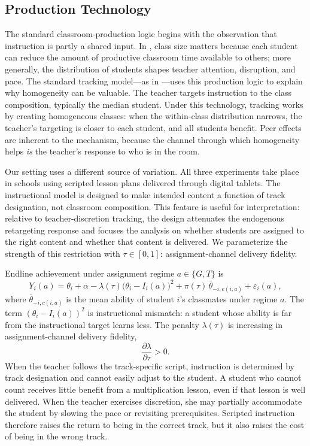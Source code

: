 \documentclass[11pt]{article}
\begin{document}
\subsection{Production Technology}

The standard classroom-production logic begins with the observation that instruction is partly a shared input. In \citet{Lazear2001}, class size matters because each student can reduce the amount of productive classroom time available to others; more generally, the distribution of students shapes teacher attention, disruption, and pace. The standard tracking model---as in \citet{duflo2011peer}---uses this production logic to explain why homogeneity can be valuable. The teacher targets instruction to the class composition, typically the median student. Under this technology, tracking works by creating homogeneous classes: when the within-class distribution narrows, the teacher's targeting is closer to each student, and all students benefit. Peer effects are inherent to the mechanism, because the channel through which homogeneity helps \emph{is} the teacher's response to who is in the room.

Our setting uses a different source of variation. All three experiments take place in schools using scripted lesson plans delivered through digital tablets. The instructional model is designed to make intended content a function of track designation, not classroom composition. This feature is useful for interpretation: relative to teacher-discretion tracking, the design attenuates the endogenous retargeting response and focuses the analysis on whether students are assigned to the right content and whether that content is delivered. We parameterize the strength of this restriction with $\tau \in [0,1]$: assignment-channel delivery fidelity.

Endline achievement under assignment regime $a \in \{G, T\}$ is
\begin{equation}
\label{eq:learning}
Y_i(a) = \theta_i + \alpha - \lambda(\tau)\big(\theta_i - I_i(a)\big)^2 + \pi(\tau)\,\bar{\theta}_{-i,c(i,a)} + \varepsilon_i(a),
\end{equation}
where $\bar{\theta}_{-i,c(i,a)}$ is the mean ability of student $i$'s classmates under regime $a$. The term $(\theta_i - I_i(a))^2$ is instructional mismatch: a student whose ability is far from the instructional target learns less. The penalty $\lambda(\tau)$ is increasing in assignment-channel delivery fidelity,
\begin{equation}
\label{eq:lambda_tau}
\frac{\partial \lambda}{\partial \tau} > 0.
\end{equation}
When the teacher follows the track-specific script, instruction is determined by track designation and cannot easily adjust to the student. A student who cannot count receives little benefit from a multiplication lesson, even if that lesson is well delivered. When the teacher exercises discretion, she may partially accommodate the student by slowing the pace or revisiting prerequisites. Scripted instruction therefore raises the return to being in the correct track, but it also raises the cost of being in the wrong track.
\end{document}
